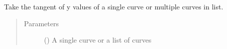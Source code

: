 \documentclass[letterpaper,10pt,english]{sphinxmanual}
\begin{document}
\begin{fulllineitems}
\label{\detokenize{pydv:pydvpy.tan}}
Take the tangent of y values of a single curve or multiple curves in list.

\begin{sphinxVerbatim}[commandchars=\\\{\}]
  
\end{sphinxVerbatim}

\begin{sphinxVerbatim}[commandchars=\\\{\}]
\end{sphinxVerbatim}
\begin{quote}\begin{description}
\item[{Parameters}] \leavevmode
{} () \textendash{} A single curve or a list of curves

\end{description}\end{quote}

\end{fulllineitems}

\end{document}
